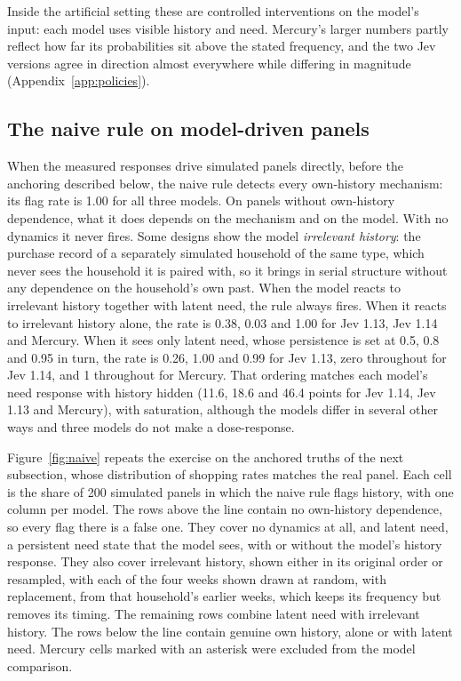 \documentclass[11pt]{article}
\begin{document}
Inside the artificial setting these are controlled interventions on the model's input: each
model uses visible history and need. Mercury's larger
numbers partly reflect how far its probabilities sit above the stated frequency, and the two
Jev versions agree in direction almost everywhere while differing in magnitude
(Appendix~\ref{app:policies}).

\subsection{The naive rule on model-driven panels}

When the measured responses drive simulated panels directly, before the anchoring described
below, the naive rule detects every own-history mechanism: its flag rate is 1.00 for all three
models. On panels without own-history dependence, what it does depends on the mechanism and
on the model. With no dynamics it never fires. Some designs show the model \emph{irrelevant
history}: the purchase record of a separately simulated household of the same type, which never
sees the household it is paired with, so it brings in serial structure without any dependence
on the household's own past. When the model reacts to irrelevant history together with latent
need, the rule always fires. When it reacts to irrelevant history alone, the
rate is 0.38, 0.03 and 1.00 for Jev 1.13, Jev 1.14 and Mercury. When it sees only latent need,
whose persistence is set at 0.5, 0.8 and 0.95 in turn, the rate is 0.26, 1.00 and 0.99 for
Jev 1.13, zero throughout for Jev 1.14, and 1 throughout for Mercury. That ordering matches
each model's need response with history hidden (11.6, 18.6 and 46.4 points for Jev 1.14, Jev
1.13 and Mercury), with saturation, although the models differ in several other ways and
three models do not make a dose-response.

Figure~\ref{fig:naive} repeats the exercise on the anchored truths of the next subsection,
whose distribution of shopping rates matches the real panel. Each cell is the share of 200
simulated panels in which the naive rule flags history, with one column per model. The rows
above the line contain no own-history dependence, so every flag there is a false one. They
cover no dynamics at all, and latent need, a persistent need state that the model sees, with
or without the model's history response. They also cover irrelevant history, shown either in
its original order or resampled, with each of the four weeks shown drawn at random, with
replacement, from that household's earlier weeks, which keeps its frequency but removes its
timing. The remaining rows combine latent need with irrelevant history. The rows below the line contain genuine
own history, alone or with latent need. Mercury cells marked with an asterisk were excluded
from the model comparison.
\end{document}
